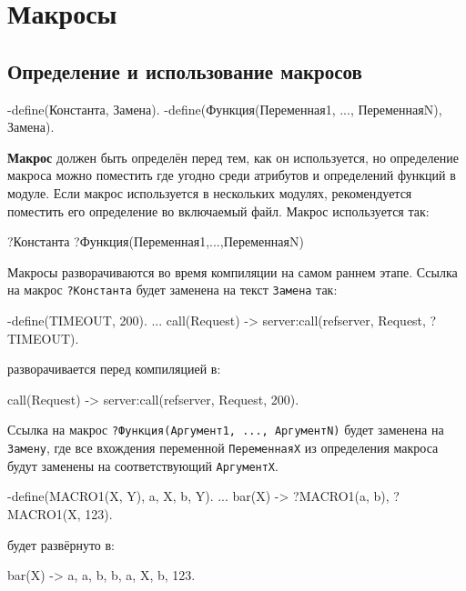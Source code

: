 \chapter{Макросы}
\label{macros}

\section{Определение и использование макросов}

\begin{erlangru}
-define(Константа, Замена).
-define(Функция(Переменная1, ..., ПеременнаяN), Замена).
\end{erlangru}

\textbf{Макрос} должен быть определён перед тем, как он используется, но 
определение макроса можно поместить где угодно среди атрибутов и определений 
функций в модуле.  Если макрос используется в нескольких модулях, рекомендуется 
поместить его определение во включаемый файл.  Макрос используется так:

\begin{erlangru}
?Константа
?Функция(Переменная1,...,ПеременнаяN)
\end{erlangru}

Макросы разворачиваются во время компиляции на самом раннем этапе.
Ссылка на макрос \texttt{?Константа} будет заменена на текст \texttt{Замена} так:

\begin{erlang}
-define(TIMEOUT, 200).
...
call(Request) ->
    server:call(refserver, Request, ?TIMEOUT).
\end{erlang}

разворачивается перед компиляцией в:

\begin{erlang}
call(Request) ->
    server:call(refserver, Request, 200).
\end{erlang}

Ссылка на макрос \texttt{?Функция(Аргумент1, ..., АргументN)} будет заменена на
\texttt{Замену}, где все вхождения переменной \texttt{ПеременнаяX} из определения
макроса будут заменены на соответствующий \texttt{АргументX}.

\begin{erlang}
-define(MACRO1(X, Y), {a, X, b, Y}).
...
bar(X) ->
    ?MACRO1(a, b),
    ?MACRO1(X, 123).
\end{erlang}

будет развёрнуто в:

\begin{erlang}
bar(X) ->
    {a, a, b, b},
    {a, X, b, 123}.
\end{erlang}

